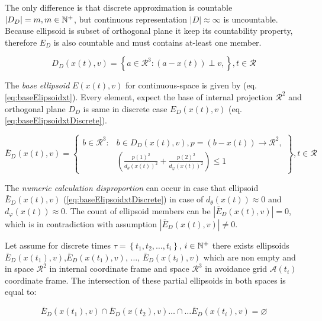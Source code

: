 The only difference is that discrete approximation is countable $|D_D|=m,m\in\mathbb{N}^+$, but continuous representation $|D|\approx \infty$ is uncountable. Because ellipsoid is subset of orthogonal plane it keep its countability property, therefore $E_D$ is also countable and must contains at-least one member.

\begin{equation}\label{eq:elisioidalOtrthogonalPlaneDiscrete}
    D_D({x}(t),{v})=\left\{{a}\in\mathscr{R}^3:({a}-{x}(t))\perp{v},\right\},t\in\mathscr{R}
\end{equation}

\noindent The \emph{base ellipsoid} $E({x}(t),{v})$ for continuous-space is given by (eq. \ref{eq:baseElipsoidxt}). Every element, expect the base of internal projection $\mathscr{R}^2$ and orthogonal plane $D_D$ is same in discrete case $E_D({x}(t),{v})$ (eq. \ref{eq:baseElipsoidxtDiscrete}).

\begin{equation}\label{eq:baseElipsoidxtDiscrete}
    \bar{E}_D({x}(t),{v})=\left\{ \begin{aligned}{b}\in\mathscr{R}^3:&{b}\in D_D({x}(t),{v}),{p}=({b}-{x}(t))\to\mathscr{R}^2,\\&\left(\frac{p(1)^2} {d_\theta({x}(t))^2}+ \frac{p(2)^2}{d_\varphi({x}(t))^2}\right)\le 1\end{aligned}\right\},t\in\mathscr{R}
\end{equation}

\noindent The \emph{numeric calculation disproportion} can occur in case that ellipsoid $\bar{E}_D({x}(t),{v})$ (\ref{eq:baseElipsoidxtDiscrete}) in case of $d_\theta({x}(t))\approx 0$ and $d_\varphi({x}(t))\approx 0$. The count of ellipsoid members can be $|\bar{E}_D({x}(t),{v})|=0$, which is in contradiction with assumption $|\bar{E}_D({x}(t),{v})|\neq 0$. 

Let assume for discrete times $\tau=\left\{t_1,t_2,\dots,t_i\right\}$, $i\in \mathbb{N}^+$ there exists ellipsoids $\bar{E}_D({x}(t_1),{v})$,$\bar{E}_D({x}(t_1),{v})$, $\dots$, $\bar{E}_D({x}(t_i),{v})$ which are non empty and in space $\mathscr{R}^2$ in internal coordinate frame and space $\mathscr{R}^3$ in avoidance grid $\mathscr{A}(t_i)$ coordinate frame. The intersection of these partial ellipsoids in both spaces is equal to:

\begin{equation}
    \bar{E}_D({x}(t_1),{v})\cap \bar{E}_D({x}(t_2),{v})\dots\cap\dots \bar{E}_D({x}(t_i),{v}) = \varnothing
\end{equation}

